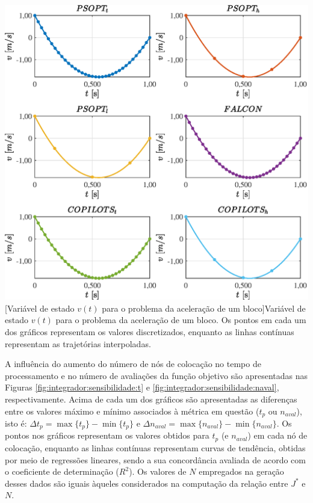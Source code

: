 \noindent
\begin{minipage}{\textwidth}
	\vspace{\onelineskip}
	\centering
	\includegraphics[scale=0.7]{fig/resultados/integrador/traj/x/v}
	[Variável de estado $v(t)$ para o problema da aceleração de um bloco]{Variável de estado $v(t)$ para o problema da aceleração de um bloco. Os pontos em cada um dos gráficos representam os valores discretizados, enquanto as linhas contínuas representam as trajetórias interpoladas.}
	\label{fig:integrador:x:v}
	\vspace{\onelineskip}
\end{minipage}

A influência do aumento do número de nós de colocação no tempo de processamento e no número de avaliações da função objetivo são apresentadas nas Figuras \ref{fig:integrador:sensibilidade:t} e \ref{fig:integrador:sensibilidade:naval}, respectivamente. Acima de cada um dos gráficos são apresentadas as diferenças entre os valores máximo e mínimo associados à métrica em questão ($ t_p $ ou $ n_{aval} $), isto é: $ \Delta t_p = \max\{t_p\} - \min\{t_p\} $ e $ \Delta n_{aval} = \max\{n_{aval}\} - \min\{n_{aval}\} $. Os pontos nos gráficos representam os valores obtidos para $ t_p $ (e $ n_{aval} $) em cada nó de colocação, enquanto as linhas contínuas representam curvas de tendência, obtidas por meio de regressões lineares, sendo a sua concordância avaliada de acordo com o coeficiente de determinação ($R^2$). Os valores de $ N $ empregados na geração desses dados são iguais àqueles considerados na computação da relação entre $ J^* $ e $ N $. 

